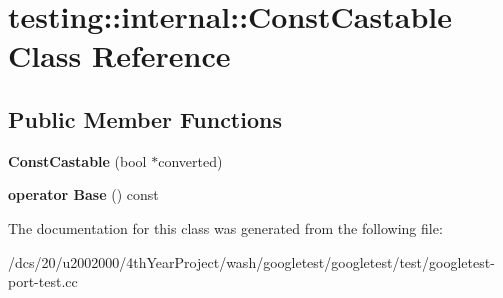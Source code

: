 \hypertarget{classtesting_1_1internal_1_1ConstCastable}{}\section{testing\+:\+:internal\+:\+:Const\+Castable Class Reference}
\label{classtesting_1_1internal_1_1ConstCastable}
\subsection*{Public Member Functions}
\begin{DoxyCompactItemize}
\item 
\mbox{\label{classtesting_1_1internal_1_1ConstCastable_a78eba470cc71528237a33a10a92fba7e}} 
{\bfseries Const\+Castable} (bool $\ast$converted)
\item 
\mbox{\label{classtesting_1_1internal_1_1ConstCastable_af084893d6786010022297b1e88f4743b}} 
{\bfseries operator Base} () const
\end{DoxyCompactItemize}


The documentation for this class was generated from the following file\+:\begin{DoxyCompactItemize}
\item 
/dcs/20/u2002000/4th\+Year\+Project/wash/googletest/googletest/test/googletest-\/port-\/test.\+cc\end{DoxyCompactItemize}
